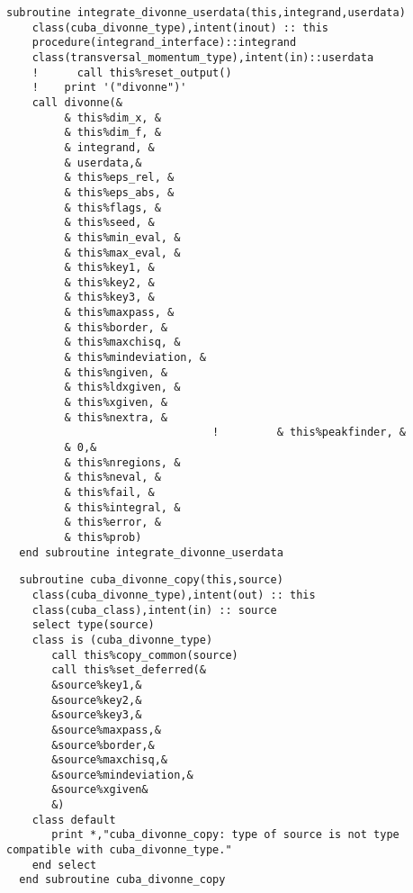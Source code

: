 \begin{Verbatim}
subroutine integrate_divonne_userdata(this,integrand,userdata)
    class(cuba_divonne_type),intent(inout) :: this  
    procedure(integrand_interface)::integrand
    class(transversal_momentum_type),intent(in)::userdata
    !      call this%reset_output()
    !    print '("divonne")'
    call divonne(&
         & this%dim_x, &
         & this%dim_f, &
         & integrand, &
         & userdata,&
         & this%eps_rel, &
         & this%eps_abs, &
         & this%flags, &
         & this%seed, &
         & this%min_eval, &
         & this%max_eval, &
         & this%key1, &
         & this%key2, &
         & this%key3, &
         & this%maxpass, &
         & this%border, &
         & this%maxchisq, &
         & this%mindeviation, &
         & this%ngiven, &
         & this%ldxgiven, &
         & this%xgiven, &
         & this%nextra, &
                                !         & this%peakfinder, &
         & 0,&
         & this%nregions, &
         & this%neval, &
         & this%fail, &
         & this%integral, &
         & this%error, &
         & this%prob)
  end subroutine integrate_divonne_userdata
\end{Verbatim}

\begin{Verbatim}
  subroutine cuba_divonne_copy(this,source)
    class(cuba_divonne_type),intent(out) :: this
    class(cuba_class),intent(in) :: source
    select type(source)
    class is (cuba_divonne_type)
       call this%copy_common(source)
       call this%set_deferred(&
       &source%key1,&
       &source%key2,&
       &source%key3,&
       &source%maxpass,&
       &source%border,&
       &source%maxchisq,&
       &source%mindeviation,&
       &source%xgiven&
       &)
    class default
       print *,"cuba_divonne_copy: type of source is not type compatible with cuba_divonne_type."
    end select
  end subroutine cuba_divonne_copy
\end{Verbatim}

